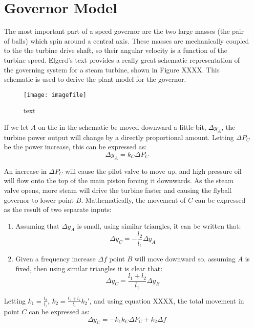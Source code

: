 \section{Governor Model}
The most important part of a speed governor are the two large masses (the pair of balls) which spin around a central axis. These masses are mechanically coupled to the the turbine drive shaft, so their angular velocity is a function of the turbine speed. Elgerd's text provides a really great schematic representation of the governing system for a steam turbine, shown in Figure XXXX. This schematic is used to derive the plant model for the governor. 

\begin{figure}
	\centering
	\texttt{[image: imagefile]}
	\caption{text}
	\label{fig:A1_schematic_of_a_steam_governor}
\end{figure}

If we let $A$ on the in the schematic be moved downward a little bit, $\Delta y_A$, the turbine power output will change by a directly proportional amount. Letting $\Delta P_C$ be the power increase, this can be expressed as:
\begin{equation}
	\Delta y_A = k_C \Delta P_C
\end{equation}

An increase in $\Delta P_C$ will cause the pilot valve to move up, and high pressure oil will flow onto the top of the main piston forcing it downwards. As the steam valve opens, more steam will drive the turbine faster and causing the flyball governor to lower point $B$. Mathematically, the movement of $C$ can be expressed as the result of two separate inputs:
\begin{enumerate}
	\item Assuming that $\Delta y_A$ is small, using similar triangles, it can be written that:
	\begin{equation}
    	\Delta y_C = - \frac{l_2}{l_1} \Delta y_A
	\end{equation}
	\item Given a frequency increase $\Delta f$ point $B$ will move downward so, assuming $A$ is fixed, then using similar triangles it is clear that:
	\begin{equation}
		\Delta y_C = \frac{l_1 + l_2}{l_1} \Delta y_B
	\end{equation}
\end{enumerate}

Letting $k_1 = \frac{l_2}{l_1}$, $k_2 = \frac{l_1 + l_2}{l_1} k_2'$, and using equation XXXX, the total movement in point $C$ can be expressed as:
\begin{equation}
	\Delta y_C = - k_1 k_C \Delta P_C + k_2 \Delta f
\end{equation}

